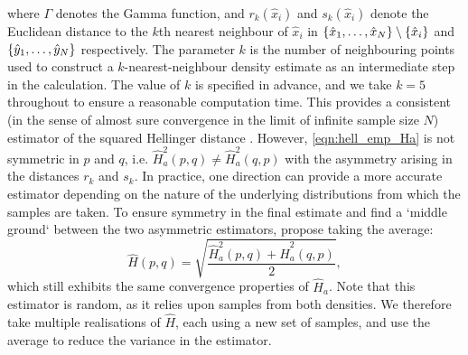 where \(\Gamma\) denotes the Gamma function, and \(r_k\!\left(\hat{x}_i\right)\) and \(s_k\!\left(\hat{x}_i\right)\) denote the Euclidean distance to the \(k\)th nearest neighbour of \(\hat{x}_i\) in \(\set{\hat{x}_1, \dotsc, \hat{x}_N} \setminus \set{\hat{x}_i}\) and \(\set{\hat{y}_1, \dotsc, \hat{y}_N}\) respectively.
The parameter \(k\) is the number of neighbouring points used to construct a \(k\)-nearest-neighbour density estimate as an intermediate step in the calculation.
The value of \(k\) is specified in advance, and we take \(k = 5\) throughout to ensure a reasonable computation time.
This provides a consistent (in the sense of almost sure convergence in the limit of infinite sample size \(N\)) estimator of the squared Hellinger distance \citep{DingMullhaupt_2023_EmpiricalSquaredHellinger}.
However, \cref{eqn:hell_emp_Ha} is not symmetric in \(p\) and \(q\), i.e. \(\hat{H}_a^2\!\left(p,q\right) \neq \hat{H}_a^2\!\left(q,p\right)\) with the asymmetry arising in the distances \(r_k\) and \(s_k\).
In practice, one direction can provide a more accurate estimator depending on the nature of the underlying distributions from which the samples are taken.
To ensure symmetry in the final estimate and find a `middle ground` between the two asymmetric estimators, \citet{DingMullhaupt_2023_EmpiricalSquaredHellinger} propose taking the average:
\begin{equation}\label{eqn:hell_emp}
	\hat{H}\!\left(p,q\right) = \sqrt{\frac{\hat{H}_a^2\!\left(p,q\right) + \hat{H}_a^2\!\left(q,p\right)}{2}},
\end{equation}
which still exhibits the same convergence properties of \(\hat{H}_a\).
Note that this estimator is random, as it relies upon samples from both densities.
We therefore take multiple realisations of \(\hat{H}\), each using a new set of samples, and use the average to reduce the variance in the estimator.

